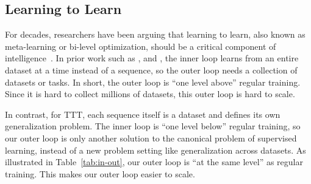 \documentclass{article}
\begin{document}
\subsection{Learning to Learn}

For decades, researchers have been arguing that learning to learn, also known as meta-learning or bi-level optimization, should be a critical component of intelligence~\cite{schmidhuber1987evolutionary, bengio1990learning, thrun1998learning, lake2017building}.
In prior work such as \cite{andrychowicz2016learning}, \cite{finn2017model} and \cite{metz2018meta}, the inner loop learns from an entire dataset at a time instead of a sequence, so the outer loop needs a collection of datasets or tasks.
In short, the outer loop  is ``one level above'' regular training.
Since it is hard to collect millions of datasets, this outer loop is hard to scale.

In contrast, for TTT, each sequence itself is a dataset and defines its own generalization problem. The inner loop is “one level below” regular training, so our outer loop is only another solution to the canonical problem of supervised learning,
instead of a new problem setting like generalization across datasets.
As illustrated in Table~\ref{tab:in-out}, our outer loop is ``at the same level'' as regular training.
This makes our outer loop easier to scale.

\renewcommand{\arraystretch}{1.6}
\begin{table}[t]
\vspace{-4ex}
\centering
{}
\caption{
In summary, our paper reformulates supervised learning as learning to learn, with two nested loops.
Highlighted rows of the outer loop are the same as in the regular training.
Parameters of the outer loop become hyper-parameters of the inner loop.
Intuitively, the inner loop, \textit{i.e.} TTT, is ``one level below'' regular training.
}
\label{tab:in-out}
\end{table}
\end{document}
